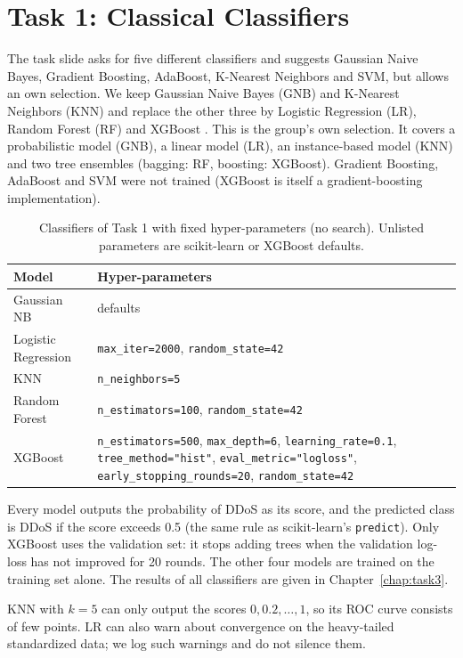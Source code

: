 \chapter{Task 1: Classical Classifiers}\label{chap:task1}

The task slide asks for five different classifiers and suggests Gaussian Naive Bayes, Gradient Boosting, AdaBoost, K-Nearest Neighbors and SVM, but allows an own selection. We keep Gaussian Naive Bayes (GNB) and K-Nearest Neighbors (KNN) and replace the other three by Logistic Regression (LR), Random Forest (RF) \cite{breiman} and XGBoost \cite{xgboost}. This is the group's own selection. It covers a probabilistic model (GNB), a linear model (LR), an instance-based model (KNN) and two tree ensembles (bagging: RF, boosting: XGBoost). Gradient Boosting, AdaBoost and SVM were not trained (XGBoost is itself a gradient-boosting implementation).

\begin{table}[htb]
\centering
\caption{Classifiers of Task 1 with fixed hyper-parameters (no search). Unlisted parameters are scikit-learn or XGBoost defaults.}\label{tab:hyper-ml}
\begin{tabular}{lp{11cm}}
\toprule
Model & Hyper-parameters \\
\midrule
Gaussian NB & defaults \\
Logistic Regression & \texttt{max\_iter=2000}, \texttt{random\_state=42} \\
KNN & \texttt{n\_neighbors=5} \\
Random Forest & \texttt{n\_estimators=100}, \texttt{random\_state=42} \\
XGBoost & \texttt{n\_estimators=500}, \texttt{max\_depth=6}, \texttt{learning\_rate=0.1}, \texttt{tree\_method="hist"}, \texttt{eval\_metric="logloss"}, \texttt{early\_stopping\_rounds=20}, \texttt{random\_state=42} \\
\bottomrule
\end{tabular}
\end{table}

Every model outputs the probability of DDoS as its score, and the predicted class is DDoS if the score exceeds 0.5 (the same rule as scikit-learn's \texttt{predict}). Only XGBoost uses the validation set: it stops adding trees when the validation log-loss has not improved for 20 rounds. The other four models are trained on the training set alone. The results of all classifiers are given in Chapter~\ref{chap:task3}.

KNN with $k=5$ can only output the scores $0, 0.2, \dots, 1$, so its ROC curve consists of few points. LR can also warn about convergence on the heavy-tailed standardized data; we log such warnings and do not silence them.
